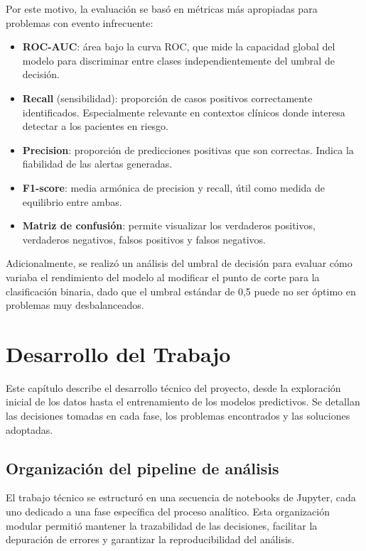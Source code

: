 \documentclass[12pt, a4paper, oneside]{report}
\begin{document}
Por este motivo, la evaluación se basó en métricas más apropiadas para problemas con evento infrecuente:

\begin{itemize}
    \item \textbf{ROC-AUC}: área bajo la curva ROC, que mide la capacidad global del modelo para discriminar entre clases independientemente del umbral de decisión.
    \item \textbf{Recall} (sensibilidad): proporción de casos positivos correctamente identificados. Especialmente relevante en contextos clínicos donde interesa detectar a los pacientes en riesgo.
    \item \textbf{Precision}: proporción de predicciones positivas que son correctas. Indica la fiabilidad de las alertas generadas.
    \item \textbf{F1-score}: media armónica de precision y recall, útil como medida de equilibrio entre ambas.
    \item \textbf{Matriz de confusión}: permite visualizar los verdaderos positivos, verdaderos negativos, falsos positivos y falsos negativos.
\end{itemize}

Adicionalmente, se realizó un análisis del umbral de decisión para evaluar cómo variaba el rendimiento del modelo al modificar el punto de corte para la clasificación binaria, dado que el umbral estándar de 0,5 puede no ser óptimo en problemas muy desbalanceados.

\chapter{Desarrollo del Trabajo}
\label{chap:desarrollo}

Este capítulo describe el desarrollo técnico del proyecto, desde la exploración inicial de los datos hasta el entrenamiento de los modelos predictivos. Se detallan las decisiones tomadas en cada fase, los problemas encontrados y las soluciones adoptadas.

\section{Organización del pipeline de análisis}

El trabajo técnico se estructuró en una secuencia de notebooks de Jupyter, cada uno dedicado a una fase específica del proceso analítico. Esta organización modular permitió mantener la trazabilidad de las decisiones, facilitar la depuración de errores y garantizar la reproducibilidad del análisis.
\end{document}
